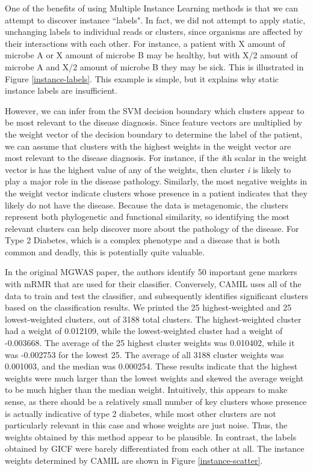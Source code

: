 One of the benefits of using Multiple Instance Learning methods is that we can attempt to discover instance ``labels". In fact, we did not attempt to apply static, unchanging labels to individual reads or clusters, since organisms are affected by their interactions with each other. For instance, a patient with X amount of microbe A or X amount of microbe B may be healthy, but with X/2 amount of microbe A and X/2 amount of microbe B they may be sick. This is illustrated in Figure \ref{instance-labels}. This example is simple, but it explains why static instance labels are insufficient.

However, we can infer from the SVM decision boundary which clusters appear to be most relevant to the disease diagnosis. Since feature vectors are multiplied by the weight vector of the decision boundary to determine the label of the patient, we can assume that clusters with the highest weights in the weight vector are most relevant to the disease diagnosis. For instance, if the \emph{i}th scalar in the weight vector is has the highest value of any of the weights, then cluster \emph{i} is likely to play a major role in the disease pathology. Similarly, the most negative weights in the weight vector indicate clusters whose presence in a patient indicates that they likely do not have the disease. Because the data is metagenomic, the clusters represent both phylogenetic and functional similarity, so identifying the most relevant clusters can help discover more about the pathology of the disease. For Type 2 Diabetes, which is a complex phenotype and a disease that is both common and deadly, this is potentially quite valuable.

In the original MGWAS paper, the authors identify 50 important gene markers with mRMR that are used for their classifier. Conversely, CAMIL uses all of the data to train and test the classifier, and subsequently identifies significant clusters based on the classification results. We printed the 25 highest-weighted and 25 lowest-weighted clusters, out of 3188 total clusters. The highest-weighted cluster had a weight of 0.012109, while the lowest-weighted cluster had a weight of -0.003668. The average of the 25 highest cluster weights was 0.010402, while it was -0.002753 for the lowest 25. The average of all 3188 cluster weights was 0.001003, and the median was 0.000254. These results indicate that the highest weights were much larger than the lowest weights and skewed the average weight to be much higher than the median weight. Intuitively, this appears to make sense, as there should be a relatively small number of key clusters whose presence is actually indicative of type 2 diabetes, while most other clusters are not particularly relevant in this case and whose weights are just noise. Thus, the weights obtained by this method appear to be plausible. In contrast, the labels obtained by GICF were barely differentiated from each other at all. The instance weights determined by CAMIL are shown in Figure \ref{instance-scatter}.